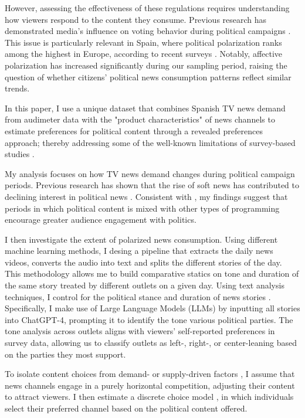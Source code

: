 \documentclass[12pt]{article}
\begin{document}
However, assessing the effectiveness of these regulations requires understanding how viewers respond to the content they consume. Previous research has demonstrated media’s influence on voting behavior during political campaigns \citep{enikolopov}. This issue is particularly relevant in Spain, where political polarization ranks among the highest in Europe, according to recent surveys \citep{edelman_trust_2023}. Notably, affective polarization has increased significantly during our sampling period, raising the question of whether citizens’ political news consumption patterns reflect similar trends.


In this paper, I use a unique dataset that combines Spanish TV news demand from audimeter data with the "product characteristics" of news channels to estimate preferences for political content through a revealed preferences approach; thereby addressing some of the well-known limitations of survey-based studies \citep{prior}.

My analysis focuses on how TV news demand changes during political campaign periods. Previous research has shown that the rise of soft news has contributed to declining interest in political news \citep{patterson2000doing}. Consistent with \cite{gambaro2021revealed}, my findings suggest that periods in which political content is mixed with other types of programming encourage greater audience engagement with politics.

I then investigate the extent of polarized news consumption. Using different machine learning methods, I desing a pipeline that extracts the daily news videos, converts the audio into text and splits the different stories of the day. This methodology allows me to build comparative statics on tone and duration of the same story treated by different outlets on a given day. Using text analysis techniques, I control for the political stance and duration of news stories \citep{puglisi_review}. Specifically, I make use of Large Language Models (LLMs) by inputting all stories into ChatGPT-4, prompting it to identify the tone various political parties. The tone analysis across outlets aligns with viewers' self-reported preferences in survey data, allowing us to classify outlets as left-, right-, or center-leaning based on the parties they most support.

To isolate content choices from demand- or supply-driven factors \citep{gentzkow2011competition}, I assume that news channels engage in a purely horizontal competition, adjusting their content to attract viewers. I then estimate a discrete choice model \citep{berry1994estimating}, in which individuals select their preferred channel based on the political content offered.
\end{document}
